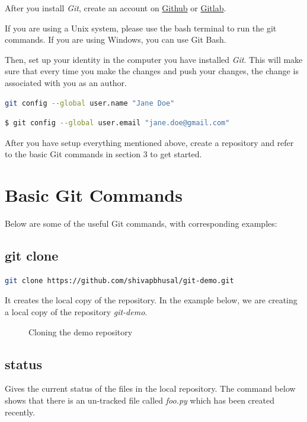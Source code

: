 \documentclass[letterpaper]{article}
\begin{document}
After you install \textit{Git}, create an account on \href{https://github.com/}{Github} or \href{https://about.gitlab.com/}{Gitlab}.

If you are using a Unix system, please use the bash terminal to run the git commands. If you are using Windows, you can use Git Bash.

Then, set up your identity in the computer you have installed \textit{Git}. This will make sure that every time you make the changes and push your changes, the change is associated with you as an author. \\

\begin{lstlisting}[language=Bash]
git config --global user.name "Jane Doe"
\end{lstlisting}

\begin{lstlisting}[language=Bash]
$ git config --global user.email "jane.doe@gmail.com"
\end{lstlisting}

After you have setup everything mentioned above, create a repository and refer to the basic Git commands in section 3 to get started. 

\section{Basic Git Commands}
Below are some of the useful Git commands, with corresponding examples:

\subsection{git clone}
\begin{lstlisting}[language=Bash]
git clone https://github.com/shivapbhusal/git-demo.git
\end{lstlisting}
It creates the local copy of the repository. In the example below, we are creating a local copy of the repository \textit{git-demo}.

 \begin{figure}[h]
    \centering
    \caption{Cloning the demo repository}
  \end{figure}

\subsection{status}
Gives the current status of the files in the local repository. The command below shows that there is an un-tracked file called \textit{foo.py} which has been created recently.
\end{document}
